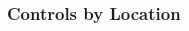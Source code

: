 \documentclass{beamer}
\begin{document}
\begin{frame}
\frametitle{Controls by Location}
\begin{columns}[T]
\begin{column}{.7\textwidth}
\begin{figure}
\setlength{\fboxsep}{0pt}%
\setlength{\fboxrule}{1pt}%
\end{figure}
\end{column}

\begin{column}{.3\textwidth}
\begin{figure}
\setlength{\fboxsep}{0pt}%
\setlength{\fboxrule}{1pt}%
\end{figure}
\end{column}
\end{columns}
\end{frame}
\end{document}
